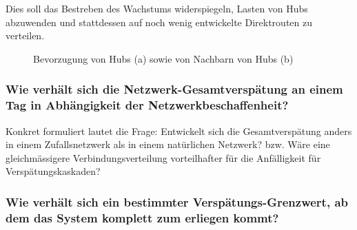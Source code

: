 Dies soll das Bestreben des Wachstums widerspiegeln, Lasten von Hubs abzuwenden und stattdessen auf noch wenig entwickelte Direktrouten zu verteilen.





\begin{figure}
    \centering
     \hspace{4em}
    \label{fig:pref-attach}
    \caption{Bevorzugung von Hubs (a) sowie von Nachbarn von Hubs (b)}
\end{figure}



\subsubsection{Wie verhält sich die Netzwerk-Gesamtverspätung an einem Tag in Abhängigkeit der Netzwerkbeschaffenheit?}
\label{subsubsec:question-1}

Konkret formuliert lautet die Frage: \guillemotleft Entwickelt sich die Gesamtverspätung anders in einem Zufallsnetzwerk als
in einem natürlichen Netzwerk? \guillemotright bzw. \guillemotleft Wäre eine gleichmässigere Verbindungsverteilung
vorteilhafter für die Anfälligkeit für Verspätungskaskaden? \guillemotright



\subsubsection{Wie verhält sich ein bestimmter Verspätungs-Grenzwert, ab dem das System komplett zum erliegen kommt?}

